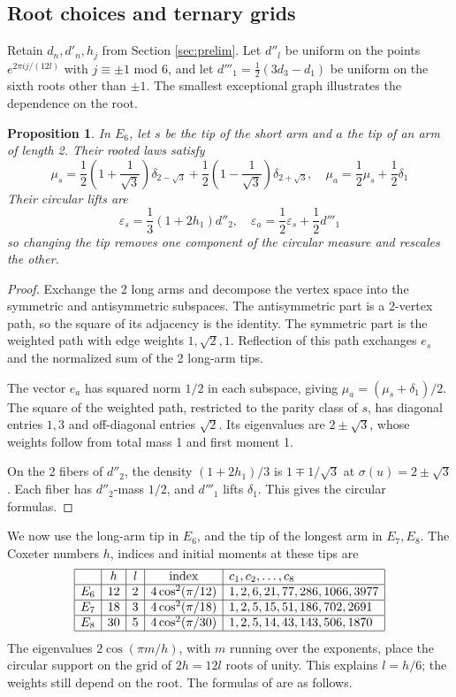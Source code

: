 \documentclass[11pt,reqno]{amsart}
\newtheorem{prop}[thm]{Proposition}
\theoremstyle{definition}
\numberwithin{equation}{section}
\begin{document}
\subsection{Root choices and ternary grids}

Retain $d_n,d'_n,h_j$ from Section \ref{sec:prelim}. Let $d''_l$ be uniform on the points $e^{2\pi ij/(12l)}$ with $j\equiv\pm1$ mod $6$, and let $d'''_1=\frac12(3d_3-d_1)$ be uniform on the sixth roots other than $\pm1$. The smallest exceptional graph illustrates the dependence on the root.

\begin{prop}\label{prop:e6-roots}
In $E_6$, let $s$ be the tip of the short arm and $a$ the tip of an arm of length 2. Their rooted laws satisfy
$$\mu_s=\frac12\left(1+\frac1{\sqrt3}\right)\delta_{2-\sqrt3}+\frac12\left(1-\frac1{\sqrt3}\right)\delta_{2+\sqrt3},\quad \mu_a=\frac12\mu_s+\frac12\delta_1$$
Their circular lifts are
$$\varepsilon_s=\frac13(1+2h_1)d''_2,\quad \varepsilon_a=\frac12\varepsilon_s+\frac12d'''_1$$
so changing the tip removes one component of the circular measure and rescales the other.
\end{prop}
\begin{proof}
Exchange the 2 long arms and decompose the vertex space into the symmetric and antisymmetric subspaces. The antisymmetric part is a 2-vertex path, so the square of its adjacency is the identity. The symmetric part is the weighted path with edge weights $1,\sqrt2,1$. Reflection of this path exchanges $e_s$ and the normalized sum of the 2 long-arm tips.

The vector $e_a$ has squared norm $1/2$ in each subspace, giving $\mu_a=(\mu_s+\delta_1)/2$. The square of the weighted path, restricted to the parity class of $s$, has diagonal entries $1,3$ and off-diagonal entries $\sqrt2$. Its eigenvalues are $2\pm\sqrt3$, whose weights follow from total mass 1 and first moment 1.

On the 2 fibers of $d''_2$, the density $(1+2h_1)/3$ is $1\mp1/\sqrt3$ at $\sigma(u)=2\pm\sqrt3$. Each fiber has $d''_2$-mass $1/2$, and $d'''_1$ lifts $\delta_1$. This gives the circular formulas.
\end{proof}

We now use the long-arm tip in $E_6$, and the tip of the longest arm in $E_7,E_8$. The Coxeter numbers $h$, indices and initial moments at these tips are
$$\begin{array}{|c|c|c|c|l|}\hline
&h&l&{\rm index}&c_1,c_2,\ldots,c_8\\\hline
E_6&12&2&4\cos^2(\pi/12)&1,2,6,21,77,286,1066,3977\\\hline
E_7&18&3&4\cos^2(\pi/18)&1,2,5,15,51,186,702,2691\\\hline
E_8&30&5&4\cos^2(\pi/30)&1,2,5,14,43,143,506,1870\\\hline
\end{array}$$
The eigenvalues $2\cos(\pi m/h)$, with $m$ running over the exponents, place the circular support on the grid of $2h=12l$ roots of unity. This explains $l=h/6$; the weights still depend on the root. The formulas of \cite{Ban09} are as follows.
\end{document}

